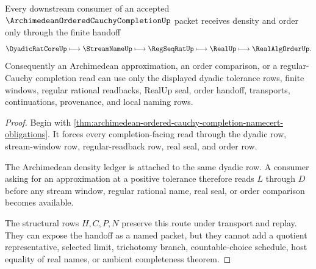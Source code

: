 \begin{theorem}
\label{thm:archimedean-ordered-cauchy-completion-density-seal}
Every downstream consumer of an accepted $\ArchimedeanOrderedCauchyCompletionUp$ packet receives density and order only through the finite handoff
$$
\DyadicRatCoreUp \longmapsto \StreamNameUp \longmapsto \RegSeqRatUp \longmapsto \RealUp \longmapsto \RealAlgOrderUp .
$$
Consequently an Archimedean approximation, an order comparison, or a regular-Cauchy completion read can use only the displayed dyadic tolerance rows, finite windows, regular rational readbacks, RealUp seal, order handoff, transports, continuations, provenance, and local naming rows.
\end{theorem}
\begin{proof}
Begin with \autoref{thm:archimedean-ordered-cauchy-completion-namecert-obligations}. It forces every completion-facing read through the dyadic row, stream-window row, regular-readback row, real seal, and order row.

The Archimedean density ledger is attached to the same dyadic row. A consumer asking for an approximation at a positive tolerance therefore reads $L$ through $D$ before any stream window, regular rational name, real seal, or order comparison becomes available.

The structural rows $H,C,P,N$ preserve this route under transport and replay. They can expose the handoff as a named packet, but they cannot add a quotient representative, selected limit, trichotomy branch, countable-choice schedule, host equality of real names, or ambient completeness theorem.
\end{proof}


